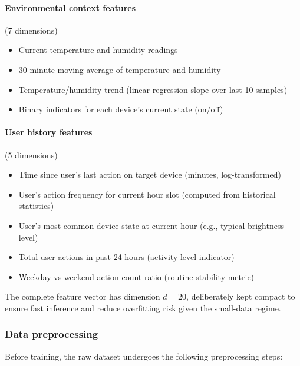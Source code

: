 \paragraph{Environmental context features} (7 dimensions)
\begin{itemize}
    \item Current temperature and humidity readings
    \item 30-minute moving average of temperature and humidity
    \item Temperature/humidity trend (linear regression slope over last 10 samples)
    \item Binary indicators for each device's current state (on/off)
\end{itemize}

\paragraph{User history features} (5 dimensions)
\begin{itemize}
    \item Time since user's last action on target device (minutes, log-transformed)
    \item User's action frequency for current hour slot (computed from historical statistics)
    \item User's most common device state at current hour (e.g., typical brightness level)
    \item Total user actions in past 24 hours (activity level indicator)
    \item Weekday vs weekend action count ratio (routine stability metric)
\end{itemize}

The complete feature vector has dimension $d = 20$, deliberately kept compact to ensure fast inference and reduce overfitting risk given the small-data regime.

\subsubsection{Data preprocessing}

Before training, the raw dataset undergoes the following preprocessing steps:

